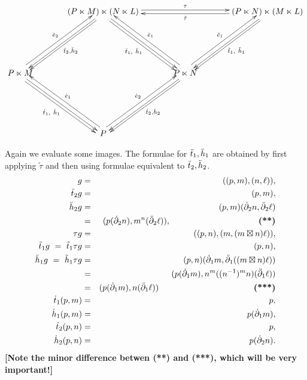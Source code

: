 $$
\xymatrix @C=3.0pc @R=5.0pc{
  & (P \ltimes M)\ltimes(N \ltimes L) 
    \ar[rr]<0.5ex>^{\tau} 
    \ar[dl]<0.2ex> \ar[dl]<+0.8ex>^{\ddttt,\ddhht}
    \ar[dr]<-0.2ex>\ar[dr]<-1.0ex>_{\ddtto,~\ddhho}
    & & (P \ltimes N)\ltimes(M \ltimes L)  
        \ar[ll]<0.5ex>^{\tilde{\tau}} 
        \ar[dl]<0.2ex> \ar[dl]<+0.8ex>^{\tilde{t}_1,~\tilde{h}_1} \\
P \ltimes M \ar[ur]<1.0ex>^{\ddeet}
\ar[dr]<-0.2ex>\ar[dr]<-1.0ex>_{\dtto,~\dhho}
      & & P \ltimes N 
      \ar[ul]<-1.0ex>_{\ddeeo} \ar[ur]<1.0ex>^{\tilde{e}_1}
      \ar[dl]<0.2ex> \ar[dl]<+0.8ex>^{\dttt,\dhht} 
        & \\
  & P \ar[ur]<1.0ex>^{\deet} \ar[ul]<-1.0ex>_{\deeo} \\
}
$$

\bigskip\noindent
Again we evaluate some images. 
The formulae for $\ddot{t}_1,\ddot{h}_1$ are obtained by first applying 
$\tilde{\tau}$ and then using formulae equivalent to $\ddot{t}_2,\ddot{h}_2$.
\begin{eqnarray*}
g &=& ((p,m),(n,\ell)), \\
\ddttt g
 &=&  (p,m), \\
\ddhht g
 &=&  (p,m)(\dbdyt n, \ddbdyt\ell) \\
 &=& (p(\dbdyt n), m^n (\ddbdyt\ell)), \hspace*{37mm}
        \mbox{{\bf (**)}} \\
\tau g
 &=&  ((p,n),(m,(m \bt n)\ell)), \\
\ddtto g ~=~ \tilde{t}_1 \tau g 
 &=&  (p,n), \\
\ddhho g ~=~ \tilde{h}_1 \tau g
 &=&  (p,n)(\dbdyo m, \ddbdyo((m \bt n)\ell)) \\
 &=& (p(\dbdyo m), n^m((n^{-1})^mn)(\ddbdyo\ell)) \\
 &=& (p(\dbdyo m), n(\ddbdyo\ell)) \hspace*{40mm} 
        \mbox{{\bf (***)}} \\
\dtto(p,m) 
 &=& p, \\
\dhho(p,m) 
 &=&  p(\dbdyo m), \\
\dttt(p,n) 
 &=&  p,\\
\dhht(p,n) 
 &=&  p(\dbdyt n). 
\end{eqnarray*}
{\bf [Note the minor difference betwen (**) and (***),
which will be very important!]}

